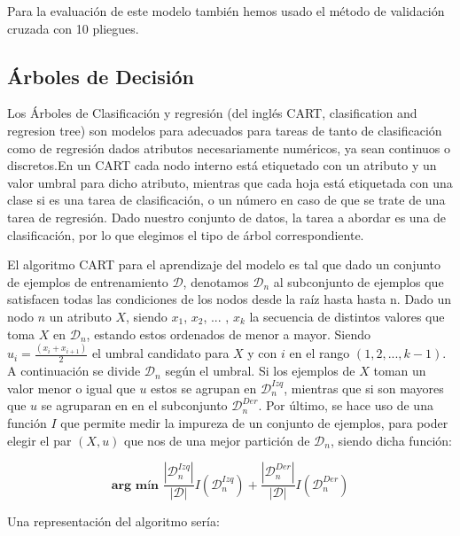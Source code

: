 \documentclass[conference,a4paper]{IEEEtran}
\begin{document}
Para la evaluación de este modelo también hemos usado el método de validación cruzada con 10 pliegues.

\subsection{Árboles de Decisión}

Los Árboles de Clasificación y regresión (del inglés CART, clasification and regresion tree) son modelos para adecuados para tareas de tanto de clasificación como de regresión dados atributos necesariamente numéricos, ya sean continuos o discretos.En un CART cada nodo interno está etiquetado con un atributo y un valor umbral para dicho atributo, mientras que cada hoja está etiquetada con una clase si es una tarea de clasificación, o un número en caso de que se trate de una tarea de regresión.  Dado nuestro conjunto de datos, la tarea a abordar es una de clasificación, por lo que elegimos el tipo de árbol correspondiente.

El algoritmo CART para el aprendizaje del modelo es tal que dado un conjunto de ejemplos de entrenamiento $\mathscr{D}$, denotamos  $\mathscr{D}_n$ al subconjunto de ejemplos que satisfacen  todas las condiciones de los nodos desde la raíz hasta hasta n. Dado un nodo $n$ un atributo $X$, siendo $x_1$, $x_2$, ... , $x_k$  la secuencia de distintos valores que toma $X$ en $\mathscr{D}_n$, estando estos ordenados de menor a mayor. Siendo $u_i = \frac{(x_i + x_{i+1})}{2} $ el umbral candidato para $X$ y con $i$ en el rango $(1, 2, ..., k-1)$. A continuación se divide  $\mathscr{D}_n$ según el umbral. Si los ejemplos de $X$ toman un valor menor o igual que $u$ estos se agrupan en  $\mathscr{D}_n^{Izq}$, mientras que si son mayores que $u$ se agruparan en en el subconjunto $\mathscr{D}_n^{Der}$. Por último, se hace uso de una función $I$ que permite medir la impureza de un conjunto de ejemplos, para poder elegir el par $(X, u)$ que nos de una mejor partición de  $\mathscr{D}_n$, siendo dicha función:

\begin{equation}
\textbf{arg mín  } \frac{|\mathscr{D}_{n}^{Izq}|}{|\mathscr{D}|}I(\mathscr{D}_{n}^{Izq})+ \frac{|\mathscr{D}_{n}^{Der}|}{|\mathscr{D}|}I(\mathscr{D}_{n}^{Der})
\end{equation}

Una representación del algoritmo sería:
\end{document}
